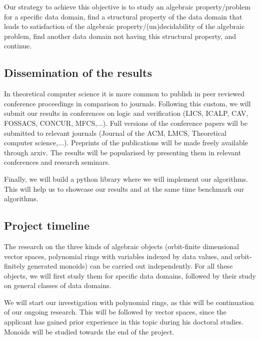 \documentclass[a4paper,11pt]{article}
\begin{document}
Our strategy to achieve this objective is to study an algebraic property/problem for a specific data domain,
find a structural property of the data domain that leads to satisfaction of the algebraic property/(un)decidability of the algebraic problem,
find another data domain not having this structural property,
and continue.
%
%
\subsection{Dissemination of the results}
%
In theoretical computer science it is more common to publish in peer reviewed conference proceedings in comparison to journals.
Following this custom,
we will submit our results in conferences on logic and verification (LICS, ICALP, CAV, FOSSACS, CONCUR, MFCS,...).
Full versions of the conference papers will be submitted to relevant journals (Journal of the ACM, LMCS, Theoretical computer science,...).
Preprints of the publications will be made freely available through arxiv.
The results will be popularised by presenting them in relevant conferences and research seminars.

Finally, we will build a python library where we will implement our algorithms.
This will help us to showcase our results and at the same time benchmark our algorithms.
%
\subsection{Project timeline}
%
The research on the three kinds of algebraic objects (orbit-finite dimensional vector spaces, polynomial rings with variables indexed by data values, and orbit-finitely generated monoids) can be carried out independently.
For all these objects,
we will first study them for specific data domains,
followed by their study on general classes of data domains.

We will start our investigation with polynomial rings,
as this will be continuation of our ongoing research.
This will be followed by vector spaces,
since the applicant has gained prior experience in this topic during his doctoral studies.
Monoids will be studied towards the end of the project.
%
\end{document}
